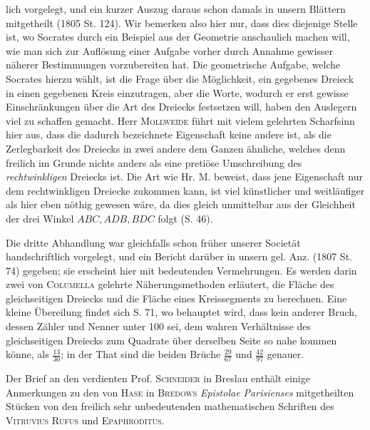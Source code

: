 %
lich vorgelegt, und ein kurzer Auszug daraus schon damals in unsern Blättern mitgetheilt (1805 St. 124). Wir bemerken also hier nur, dass dies diejenige Stelle ist, wo Socrates durch ein Beispiel aus der Geometrie anschaulich machen will, wie man sich zur Auflösung einer Aufgabe vorher durch Annahme gewisser näherer Bestimmungen vorzubereiten hat. Die geometrische Aufgabe, welche Socrates hierzu wählt, ist die Frage über die Möglichkeit, ein gegebenes Dreieck in einen gegebenen Kreis einzutragen, aber die Worte, wodurch er erst gewisse Einschränkungen über die Art des Dreiecks festsetzen will, haben den Auslegern viel zu schaffen gemacht. Herr \textsc{Mollweide} führt mit vielem gelehrten Scharfsinn hier aus, dass die dadurch bezeichnete Eigenschaft keine andere ist, als die Zerlegbarkeit des Dreiecks in zwei andere dem Ganzen ähnliche, welches denn freilich im Grunde nichts anders als eine pretiöse Umschreibung des \textit{rechtwinkligen} Dreiecks ist. Die Art wie Hr. M. beweist, dass jene Eigenschaft nur dem rechtwinkligen Dreiecke zukommen kann, ist viel künstlicher und weitläufiger als hier eben nöthig gewesen wäre, da dies gleich unmittelbar aus der Gleichheit der drei Winkel \(ABC,ADB,BDC\) folgt (S. 46).

Die dritte Abhandlung war gleichfalls schon früher unserer Societät handschriftlich vorgelegt, und ein Bericht darüber in unsern gel. Anz. (1807 St. 74) gegeben; sie erscheint hier mit bedeutenden Vermehrungen. Es werden darin zwei von \textsc{Columella} gelehrte Näherungsmethoden erläutert, die Fläche des gleichseitigen Dreiecks und die Fläche eines Kreissegments zu berechnen. Eine kleine Übereilung findet sich S. 71, wo behauptet wird, dass kein anderer Bruch, dessen Zähler und Nenner unter 100 sei, dem wahren Verhältnisse des gleichseitigen Dreiecks zum Quadrate über derselben Seite so nahe kommen könne, als \(\frac{13}{30}\); in der That sind die beiden Brüche \(\frac{29}{67}\) und \(\frac{42}{97}\) genauer.

Der Brief an den verdienten Prof. \textsc{Schneider} in Breslau enthält einige Anmerkungen zu den von \textsc{Hase} in \textsc{Bredows} \textit{Epistolae Parisienses} mitgetheilten Stücken von den freilich sehr unbedeutenden mathematischen Schriften des \textsc{Vitruvius Rufus} und \textsc{Epaphroditus}.

